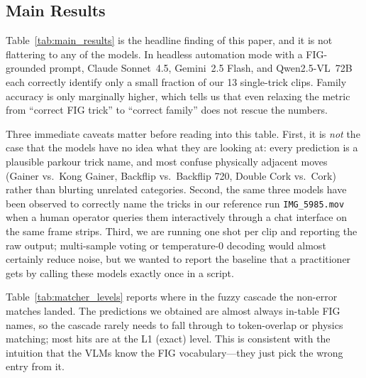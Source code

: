\subsection{Main Results}
\label{sec:experiments:main}

\begin{table}[t]
  \centering
  \small
  
  \caption{\textbf{Main results on POOL-B} (13 single-trick clips,
  one shot per clip). Trick top-1 is an exact FIG-name match after the
  fuzzy matcher cascade; family accuracy is a first-token match
  (``Backflip 720'' predicted as ``Backflip 360'' counts as a family
  hit). D-score MAE is in FIG base-difficulty units. \emph{None of the
  tested configurations achieve strong top-1 accuracy in this
  headless setting}, a finding we discuss below and in
  Sec.~\ref{sec:discussion}.}
  \label{tab:main_results}
\end{table}

Table~\ref{tab:main_results} is the headline finding of this paper,
and it is not flattering to any of the models. In
headless automation mode with a FIG-grounded prompt, Claude
Sonnet~4.5, Gemini~2.5 Flash, and Qwen2.5-VL~72B each correctly
identify only a small fraction of our 13 single-trick clips. Family
accuracy is only marginally higher, which tells us that even
relaxing the metric from ``correct FIG trick'' to ``correct family''
does not rescue the numbers.

Three immediate caveats matter before reading into this table.
First, it is \emph{not} the case that the models have no idea what
they are looking at: every prediction is a plausible parkour trick
name, and most confuse physically adjacent moves (Gainer vs.\ Kong
Gainer, Backflip vs.\ Backflip 720, Double Cork vs.\ Cork) rather
than blurting unrelated categories. Second, the same three models
have been observed to correctly name the tricks in our reference
run \texttt{IMG\_5985.mov} when a human operator queries them
interactively through a chat interface on the same frame strips.
Third, we are running one shot per clip and reporting the raw output;
multi-sample voting or temperature-$0$ decoding would almost
certainly reduce noise, but we wanted to report the baseline that a
practitioner gets by calling these models exactly once in a script.

Table~\ref{tab:matcher_levels} reports where in the fuzzy cascade the
non-error matches landed. The predictions we obtained are almost
always in-table FIG names, so the cascade rarely needs to fall through
to token-overlap or physics matching; most hits are at the L1
(exact) level. This is consistent with the intuition that the VLMs
know the FIG vocabulary---they just pick the wrong entry from it.

